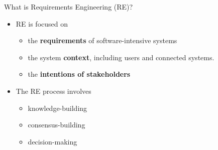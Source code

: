 

\begin{Slide}{What is Requirements Engineering (RE)?}

\begin{itemize}
\item RE is focused on 
\begin{itemize}
\item the \textbf{requirements} of software-intensive systems 
\item the system \textbf{context}, including users and connected systems.
\item the \textbf{intentions of stakeholders}

\end{itemize}
\item The RE process involves 
\begin{itemize}
\item knowledge-building
\item consensus-building
\item decision-making


\end{itemize}
\end{itemize}
\end{Slide}